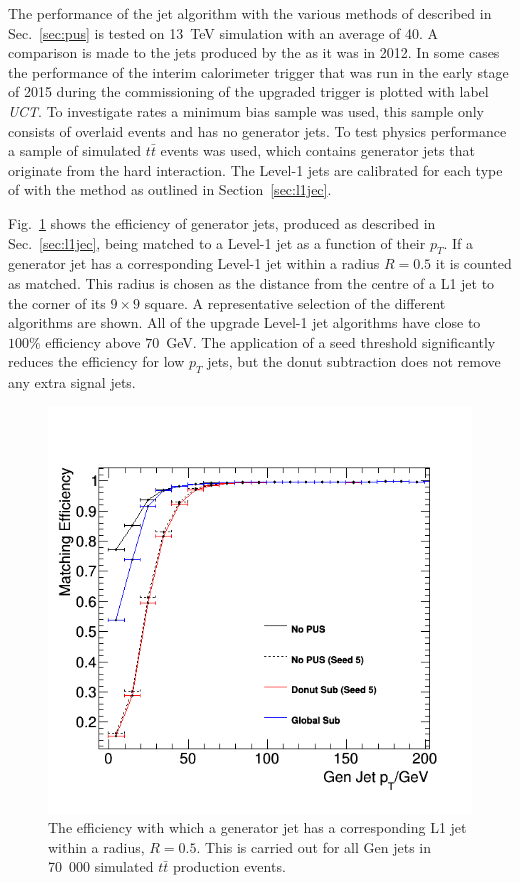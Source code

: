 The performance of the jet algorithm with the various methods of \PUS 
described in Sec.~\ref{sec:pus} is tested on 13~TeV \MC simulation with an
average \PU of 40. A comparison is made to the jets produced by the
\GCT as it was in 2012. In some cases the performance of the interim
calorimeter trigger that was run in the early stage of 2015 during the
commissioning of the upgraded trigger is plotted with label
\emph{UCT}. To investigate rates a minimum bias sample was used, this
sample only consists of overlaid \PU events and has no generator jets.
To test physics performance a sample of simulated $t\bar{t}$
events was used, which contains generator jets that originate from
the hard interaction. The Level-1 jets are calibrated for each
type of \PUS with the method as outlined in Section~\ref{sec:l1jec}.

Fig.~\ref{fig:matchingeff} shows the efficiency of generator jets,
produced as described in Sec.~\ref{sec:l1jec}, being matched to a
Level-1 jet as a function of their $p_T$. If a generator jet has a
corresponding Level-1 jet within a radius $R=0.5$ it is counted as
matched.
This radius is chosen as the distance from the centre of a L1 jet to
the corner of its $9\times9$ square. A representative selection of the
different \PUS algorithms are shown. All of the upgrade Level-1 jet
algorithms have close to $100\%$ efficiency above $70$~GeV. The
application of a seed threshold significantly reduces the efficiency
for low $p_T$ jets, but the donut subtraction does not remove any
extra signal jets.
\begin{figure}
	\begin{center}
		\includegraphics[width=0.6\linewidth]{figs/trigger/performance/matchingeff_alljet}
	\end{center}
	\caption{The efficiency with which a generator jet has a
  corresponding L1 jet within a radius, $R=0.5$. This is carried out
  for all Gen jets in 70~000 simulated $t\bar{t}$ production events.}
	\label{fig:matchingeff}
\end{figure}

